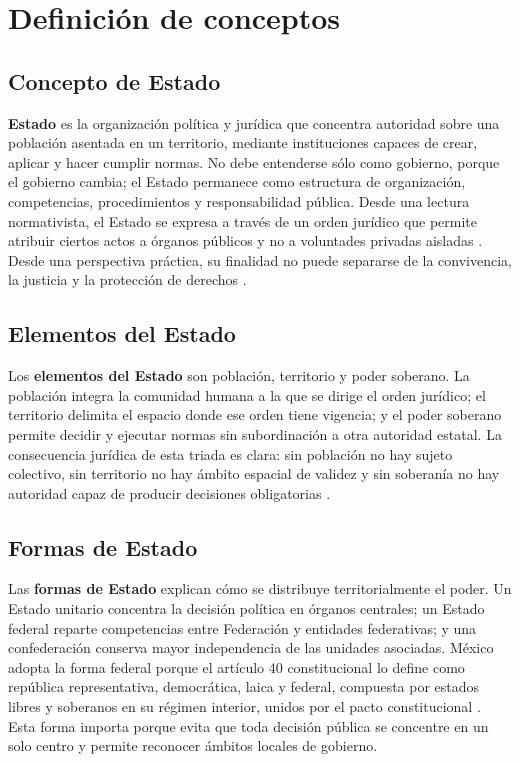 \documentclass[
	spanish,
	letterpaper, oneside
]{article}
\begin{document}
\section{Definición de conceptos}

\subsection{Concepto de Estado}

\textbf{Estado} es la organización política y jurídica que concentra autoridad sobre una población asentada en un territorio, mediante instituciones capaces de crear, aplicar y hacer cumplir normas. No debe entenderse sólo como gobierno, porque el gobierno cambia; el Estado permanece como estructura de organización, competencias, procedimientos y responsabilidad pública. Desde una lectura normativista, el Estado se expresa a través de un orden jurídico que permite atribuir ciertos actos a órganos públicos y no a voluntades privadas aisladas \citep{kelsenTeoriaPuraDerecho2009}. Desde una perspectiva práctica, su finalidad no puede separarse de la convivencia, la justicia y la protección de derechos \citep{lovonManualPracticoFilosofia2020}.

\subsection{Elementos del Estado}

Los \textbf{elementos del Estado} son población, territorio y poder soberano. La población integra la comunidad humana a la que se dirige el orden jurídico; el territorio delimita el espacio donde ese orden tiene vigencia; y el poder soberano permite decidir y ejecutar normas sin subordinación a otra autoridad estatal. La consecuencia jurídica de esta triada es clara: sin población no hay sujeto colectivo, sin territorio no hay ámbito espacial de validez y sin soberanía no hay autoridad capaz de producir decisiones obligatorias \citep{lovonManualPracticoFilosofia2020,cpeum2026}.

\subsection{Formas de Estado}

Las \textbf{formas de Estado} explican cómo se distribuye territorialmente el poder. Un Estado unitario concentra la decisión política en órganos centrales; un Estado federal reparte competencias entre Federación y entidades federativas; y una confederación conserva mayor independencia de las unidades asociadas. México adopta la forma federal porque el artículo 40 constitucional lo define como república representativa, democrática, laica y federal, compuesta por estados libres y soberanos en su régimen interior, unidos por el pacto constitucional \citep{cpeum2026}. Esta forma importa porque evita que toda decisión pública se concentre en un solo centro y permite reconocer ámbitos locales de gobierno.
\end{document}
